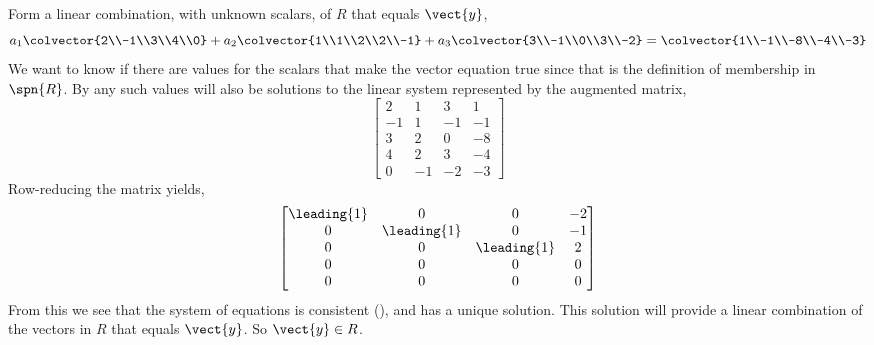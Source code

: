Form a linear combination, with unknown scalars, of $R$ that equals $\vect{y}$,
%
\begin{equation*}
a_1\colvector{2\\-1\\3\\4\\0}+
a_2\colvector{1\\1\\2\\2\\-1}+
a_3\colvector{3\\-1\\0\\3\\-2}
=
\colvector{1\\-1\\-8\\-4\\-3}
\end{equation*}
%
We want to know if there are values for the scalars that make the vector equation true since that is the definition of membership in $\spn{R}$.  By  any such values will also be solutions to the linear system represented by the augmented matrix,
%
\begin{equation*}
\begin{bmatrix}
2 & 1 & 3 & 1\\
-1 & 1 & -1 & -1\\
3 & 2 & 0 & -8\\
4 & 2 & 3 & -4\\
0 & -1 & -2 & -3
\end{bmatrix}
\end{equation*}
%
Row-reducing the matrix yields,
%
\begin{equation*}
\begin{bmatrix}
\leading{1} & 0 & 0 & -2\\
0 & \leading{1} & 0 & -1\\
0 & 0 & \leading{1} & 2\\
0 & 0 & 0 & 0\\
0 & 0 & 0 & 0
\end{bmatrix}
\end{equation*}
%
From this we  see that the system of equations is consistent (), and has a unique solution.  This solution will provide a linear combination of the vectors in $R$ that equals $\vect{y}$. So $\vect{y}\in R$.
